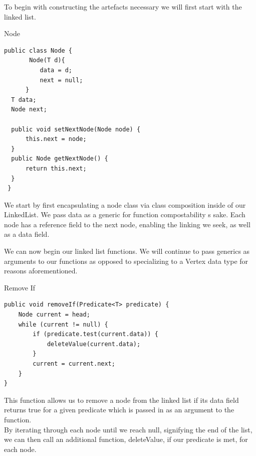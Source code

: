 \documentclass[a4paper]{article}
\begin{document}
To begin with constructing the artefacts necessary we will first start with the linked list.


\makeatletter
\renewcommand{\ALG@name}{Nested Class}
\makeatother
\setcounter{algorithm}{0}

\begin{algorithm}
\caption{Node}\label{euclid}
\begin{verbatim}
public class Node {
       Node(T d){
          data = d;
          next = null;
      }
  T data;
  Node next;

  public void setNextNode(Node node) {
      this.next = node;
  }
  public Node getNextNode() {
      return this.next;
  }
 }
\end{verbatim}
\end{algorithm}

We start by first encapsulating a node 
class via class composition inside of our LinkedList. We pass data as
a generic for function compostability s sake. Each node has a reference field 
to the next node, enabling the linking we seek, as well as a data field.

\newpage

We can now begin our linked list functions. We will continue to pass
generics as arguments to our functions as opposed to specializing to a Vertex data type
for reasons aforementioned. \\

\makeatletter
\renewcommand{\ALG@name}{Function}
\makeatother
\setcounter{algorithm}{0}

\begin{algorithm}
\caption{Remove If}\label{euclid}

\begin{verbatim}
public void removeIf(Predicate<T> predicate) {
    Node current = head;
    while (current != null) {
        if (predicate.test(current.data)) {
            deleteValue(current.data);
        }
        current = current.next;
    }
}
\end{verbatim}
\end{algorithm}

This function allows us to remove a node from the linked list 
if its data field returns true for a given predicate
which is passed in as an argument to the function. \\

By iterating through each node until we reach null, signifying
the end of the list, we can then call an additional 
function, deleteValue, if our predicate is met, for each node.
\end{document}
